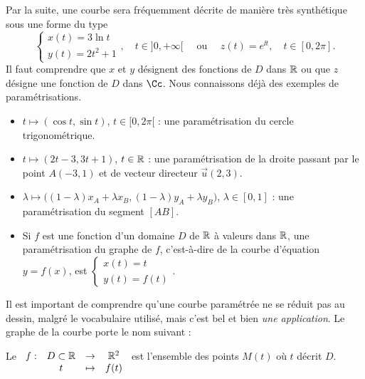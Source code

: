 \documentclass[class=report,crop=false]{standalone}
\begin{document}
Par la suite, une courbe sera
fréquemment décrite de manière très synthétique sous une forme du type
$$\left\{
\begin{array}{l}
x(t) = 3\ln t\\
y(t) = 2t^2+1
\end{array}
\right., \quad t\in]0,+\infty[ \quad \text{ ou } \quad z(t) = e^{\ii t}, \quad t\in[0,2\pi].$$
Il faut comprendre que $x$ et $y$ désignent des fonctions de $D$ dans $\mathbb{R}$
ou que $z$ désigne une fonction de $D$ dans $\Cc$.
Nous connaissons déjà des exemples de paramétrisations.
\begin{exemple}
\sauteligne
\begin{itemize}
\item $t\mapsto (\cos t,\sin t)$, $t\in[0,2\pi[$ : une paramétrisation du cercle trigonométrique.

\item $t\mapsto(2t-3,3t+1)$, $t\in\mathbb{R}$ : une paramétrisation de la droite
passant par le point $A(-3,1)$ et de vecteur directeur $\vec{u}(2,3)$.

\item $\lambda\mapsto\big((1-\lambda)x_A+\lambda x_B,(1-\lambda)y_A+\lambda y_B\big)$,
$\lambda\in[0,1]$ : une paramétrisation du segment $[AB]$.

\item Si $f$ est une fonction d'un domaine $D$ de
$\mathbb{R}$ à valeurs dans $\mathbb{R}$, une paramétrisation du graphe de $f$,
c'est-à-dire de la courbe d'équation $y=f(x)$, est $\left\{
\begin{array}{l}
x(t)=t\\
y(t)=f(t)
\end{array}
\right.$.
\end{itemize}


\end{exemple}

Il est important de comprendre qu'une courbe paramétrée
ne se réduit pas au dessin, malgré le vocabulaire utilisé,
mais c'est bel et bien \emph{une application}.
Le graphe de la courbe porte le nom suivant :
\begin{definition}
Le  $\begin{array}[t]{cccc}
f :&D\subset\mathbb{R}&\rightarrow&\mathbb{R}^2\\
 &t&\mapsto&f(t)
\end{array}$ est l'ensemble des points $M(t)$ où $t$ décrit $D$.
\end{definition}
\end{document}
